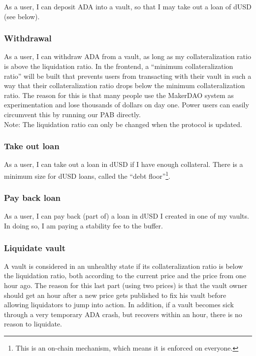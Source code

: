 \documentclass{article} %
\begin{document}
As a user, I can deposit ADA into a vault, so that I may take out a loan of dUSD
(see below).

\subsubsection{Withdrawal}

As a user, I can withdraw ADA from a vault, as long as my collateralization
ratio is above the liquidation ratio.
In the frontend, a ``minimum collateralization ratio'' will be built that
prevents users from transacting with their vault in such a way that their
collateralization ratio drops below the minimum collateralization ratio.
The reason for this is that many people use the MakerDAO system as
experimentation and lose thousands of dollars on day one.
Power users can easily circumvent this by running our PAB directly. \\

Note: The liquidation ratio can only be changed when the protocol is updated.

\subsubsection{Take out loan}

As a user, I can take out a loan in dUSD if I have enough collateral.
There is a minimum size for dUSD loans, called the ``debt floor''\footnote{
  This is an on-chain mechanism, which means it is enforced on everyone.
}.

\subsubsection{Pay back loan}

As a user, I can pay back (part of) a loan in dUSD I created in one of my
vaults.
In doing so, I am paying a stability fee to the buffer.

\subsubsection{Liquidate vault}

A vault is considered in an unhealthy state if its collateralization ratio is
below the liquidation ratio, both according to the current price and the price
from one hour ago.
The reason for this last part (using two prices) is that the vault owner should
get an hour after a new price gets published to fix his vault before allowing
liquidators to jump into action.
In addition, if a vault becomes sick through a very temporary ADA crash, but
recovers within an hour, there is no reason to liquidate. \\
\end{document}

